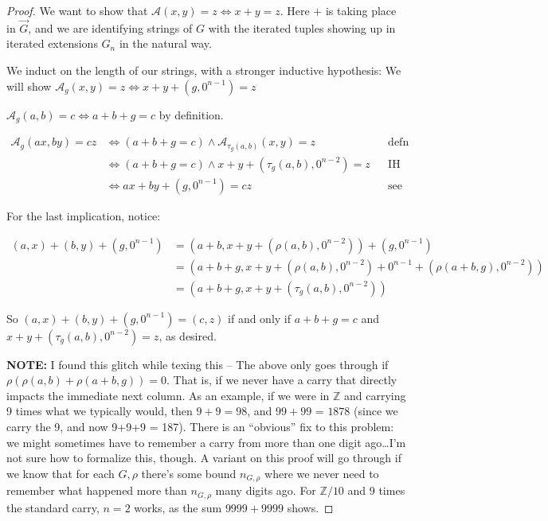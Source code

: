 \documentclass[12pt]{article}
\theoremstyle{definition}
\newcommand{\Z}{\mathbb{Z}}
\begin{document}
  \begin{proof}
    We want to show that $\mathcal{A}(x,y) = z \iff x+y=z$. 
    Here $+$ is taking place in $\overrightarrow{G}$, and we are identifying
    strings of $G$ with the iterated tuples showing up in iterated extensions
    $G_n$ in the natural way.

    We induct on the length of our strings, with a stronger inductive hypothesis:
    We will show $\mathcal{A}_g(x,y) = z \iff x+y+(g,0^{n-1}) = z$

    \bigskip

    $\mathcal{A}_g(a,b) = c \iff a + b + g = c$ by definition.

    \begin{align*}
      \mathcal{A}_g(ax,by) = cz 
      &\iff (a+b+g=c) \land \mathcal{A}_{\tau_g(a,b)}(x,y) = z && \text{defn}\\
      &\iff (a+b+g=c) \land x+y+(\tau_g(a,b),0^{n-2}) = z      && \text{IH}\\
      &\iff ax + by + (g,0^{n-1}) = cz                         && \text{see below}
    \end{align*}

    For the last implication, notice:

    \begin{align*}
      (a,x) + (b,y) + (g,0^{n-1}) 
      &= (a+b, x+y+(\rho(a,b),0^{n-2})) + (g,0^{n-1})\\
      &= (a+b+g, x+y+(\rho(a,b),0^{n-2}) + 0^{n-1} + (\rho(a+b,g),0^{n-2}))\\ 
      &= (a+b+g, x+y+(\tau_g(a,b), 0^{n-2}))
    \end{align*}

    So $(a,x) + (b,y) + (g,0^{n-1}) = (c,z)$ if and only if 
    $a+b+g=c$ and $x+y+(\tau_g(a,b),0^{n-2}) = z$, as desired.

    \newpage

    \textbf{NOTE:} I found this glitch while texing this -- The above only 
    goes through if $\rho(\rho(a,b) + \rho(a+b,g)) = 0$. That is, if we never
    have a carry that directly impacts the immediate next column. As an 
    example, if we were in $\Z$ and carrying 9 times what we typically would,
    then $9 + 9 = 98$, and $99 + 99$ = $1878$ 
    (since we carry the 9, and now 9+9+9 = 187).
    There is an ``obvious'' fix to this problem: we might sometimes have to
    remember a carry from more than one digit ago\ldots I'm not sure how to
    formalize this, though. A variant on this proof will go through if we 
    know that for each $G, \rho$ there's some bound $n_{G,\rho}$ 
    where we never need to remember what happened more than $n_{G,\rho}$ 
    many digits ago. For $\Z / 10$ and 9 times the standard carry, $n=2$
    works, as the sum $9999 + 9999$ shows.
  \end{proof}
\end{document}
